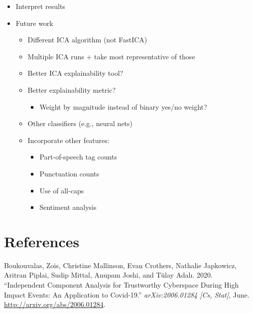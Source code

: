 \documentclass{article}
\begin{document}
\label{sec:discuss}

\begin{itemize}
\tightlist
\item
  Interpret results
\item
  Future work

  \begin{itemize}
  \tightlist
  \item
    Different ICA algorithm (not FastICA)
  \item
    Multiple ICA runs + take most representative of those
  \item
    Better ICA explainability tool?
  \item
    Better explainability metric?

    \begin{itemize}
    \tightlist
    \item
      Weight by magnitude instead of binary yes/no weight?
    \end{itemize}
  \item
    Other classifiers (e.g., neural nets)
  \item
    Incorporate other features:

    \begin{itemize}
    \tightlist
    \item
      Part-of-speech tag counts
    \item
      Punctuation counts
    \item
      Use of all-caps
    \item
      Sentiment analysis
    \end{itemize}
  \end{itemize}
\end{itemize}

\newpage

\hypertarget{references}{%
\section*{References}\label{references}}

\hypertarget{refs}{}
\leavevmode\hypertarget{ref-boukouvalas_independent_2020}{}%
Boukouvalas, Zois, Christine Mallinson, Evan Crothers, Nathalie
Japkowicz, Aritran Piplai, Sudip Mittal, Anupam Joshi, and Tülay Adalı.
2020. ``Independent Component Analysis for Trustworthy Cyberspace During
High Impact Events: An Application to Covid-19.'' \emph{arXiv:2006.01284
{[}Cs, Stat{]}}, June. \url{http://arxiv.org/abs/2006.01284}.
\end{document}
